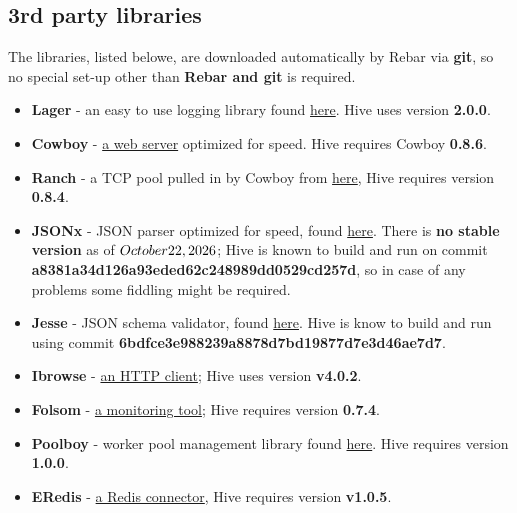 \documentclass[a4paper]{article}
\begin{document}
\subsection{3rd party libraries}
\label{sec-1-3}

The libraries, listed belowe, are downloaded automatically by Rebar via \textbf{git}, so no special set-up other than \textbf{Rebar and git} is required.


\begin{itemize}
\item \textbf{Lager} - an easy to use logging library found \href{https://github.com/basho/lager}{here}. Hive uses version \textbf{2.0.0}.
\item \textbf{Cowboy} - \href{https://github.com/extend/cowboy}{a web server} optimized for speed. Hive requires Cowboy \textbf{0.8.6}.
\item \textbf{Ranch} - a TCP pool pulled in by Cowboy from \href{https://github.com/extend/ranch}{here}, Hive requires version \textbf{0.8.4}.
\item \textbf{JSONx} - JSON parser optimized for speed, found \href{https://github.com/iskra/jsonx}{here}. There is \textbf{no stable version} as of $\today$; Hive is known to build and run on commit \textbf{a8381a34d126a93eded62c248989dd0529cd257d}, so in case of any problems some fiddling might be required.
\item \textbf{Jesse} - JSON schema validator, found \href{https://github.com/alertlogic/jesse}{here}. Hive is know to build and run using commit \textbf{6bdfce3e988239a8878d7bd19877d7e3d46ae7d7}.
\item \textbf{Ibrowse} - \href{https://github.com/cmullaparthi/ibrowse}{an HTTP client}; Hive uses version \textbf{v4.0.2}.
\end{itemize}

\label{ref-folsom}

\begin{itemize}
\item \textbf{Folsom} - \href{https://github.com/boundary/folsom}{a monitoring tool}; Hive requires version \textbf{0.7.4}.
\item \textbf{Poolboy} - worker pool management library found \href{https://github.com/devinus/poolboy}{here}. Hive requires version \textbf{1.0.0}.
\item \textbf{ERedis} - \href{https://github.com/wooga/eredis}{a Redis connector}, Hive requires version \textbf{v1.0.5}.
\end{itemize}
\end{document}
